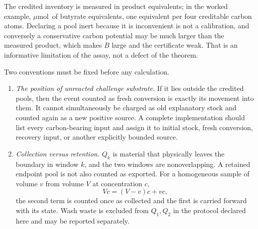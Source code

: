 \documentclass[11pt]{article}
\theoremstyle{plain}
\theoremstyle{definition}
\theoremstyle{remark}
\newcommand{\mumol}{\ensuremath{\mu\mathrm{mol}}}
\begin{document}
The credited inventory is measured in product equivalents; in the worked
example, \mumol\ of butyrate equivalents, one equivalent per four creditable
carbon atoms. Declaring a pool inert because it is inconvenient is not a
calibration, and conversely a conservative carbon potential may be much larger
than the measured product, which makes $B$ large and the certificate weak.
That is an informative limitation of the assay, not a defect of the theorem.

Two conventions must be fixed before any calculation.

\begin{enumerate}
\item \emph{The position of unreacted challenge substrate.} If it lies outside
the credited pools, then the event counted as fresh conversion is exactly its
movement into them. It cannot simultaneously be charged as old explanatory
stock and counted again as a new positive source. A complete implementation
should list every carbon-bearing input and assign it to initial stock, fresh
conversion, recovery input, or another explicitly bounded source.
\item \emph{Collection versus retention.} $Q_k$ is material that physically
leaves the boundary in window $k$, and the two windows are nonoverlapping. A
retained endpoint pool is not also counted as exported. For a homogeneous
sample of volume $v$ from volume $V$ at concentration $c$,
\[
 Vc=(V-v)c+vc ,
\]
the second term is counted once as collected and the first is carried forward
with its state. Wash waste is excluded from $Q_1,Q_2$ in the protocol declared
here and may be reported separately.
\end{enumerate}
\end{document}

